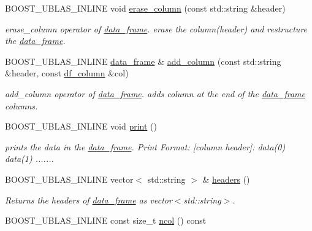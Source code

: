 \begin{DoxyCompactItemize}
B\+O\+O\+S\+T\+\_\+\+U\+B\+L\+A\+S\+\_\+\+I\+N\+L\+I\+NE void \hyperlink{classboost_1_1numeric_1_1ublas_1_1data__frame_a644ace7139044eaabf7e0a0e45f63b2e}{erase\+\_\+column} (const std\+::string \&header)
\begin{DoxyCompactList}\small\item\em erase\+\_\+column operator of \hyperlink{classboost_1_1numeric_1_1ublas_1_1data__frame}{data\+\_\+frame}. erase the column({\ttfamily header}) and restructure the \hyperlink{classboost_1_1numeric_1_1ublas_1_1data__frame}{data\+\_\+frame}. \end{DoxyCompactList}\item 
B\+O\+O\+S\+T\+\_\+\+U\+B\+L\+A\+S\+\_\+\+I\+N\+L\+I\+NE \hyperlink{classboost_1_1numeric_1_1ublas_1_1data__frame}{data\+\_\+frame} \& \hyperlink{classboost_1_1numeric_1_1ublas_1_1data__frame_a8f67aa27f8f340e8bfd42ce0f7713be0}{add\+\_\+column} (const std\+::string \&header, const \hyperlink{classboost_1_1numeric_1_1ublas_1_1df__column}{df\+\_\+column} \&col)
\begin{DoxyCompactList}\small\item\em add\+\_\+column operator of \hyperlink{classboost_1_1numeric_1_1ublas_1_1data__frame}{data\+\_\+frame}. adds column at the end of the \hyperlink{classboost_1_1numeric_1_1ublas_1_1data__frame}{data\+\_\+frame} columns. \end{DoxyCompactList}\item 
B\+O\+O\+S\+T\+\_\+\+U\+B\+L\+A\+S\+\_\+\+I\+N\+L\+I\+NE void \hyperlink{classboost_1_1numeric_1_1ublas_1_1data__frame_a2aae0aa66a1eadc3301b40cd104596c1}{print} ()
\begin{DoxyCompactList}\small\item\em prints the data in the \hyperlink{classboost_1_1numeric_1_1ublas_1_1data__frame}{data\+\_\+frame}. Print Format\+: \mbox{[}column header\mbox{]}\+: data(0) data(1) ....... \end{DoxyCompactList}\item 
B\+O\+O\+S\+T\+\_\+\+U\+B\+L\+A\+S\+\_\+\+I\+N\+L\+I\+NE vector$<$ std\+::string $>$ \& \hyperlink{classboost_1_1numeric_1_1ublas_1_1data__frame_aff5e603e988e7b710a3df6104d706c12}{headers} ()
\begin{DoxyCompactList}\small\item\em Returns the headers of \hyperlink{classboost_1_1numeric_1_1ublas_1_1data__frame}{data\+\_\+frame} as vector$<$std\+::string$>$. \end{DoxyCompactList}\item 
B\+O\+O\+S\+T\+\_\+\+U\+B\+L\+A\+S\+\_\+\+I\+N\+L\+I\+NE const size\+\_\+t \hyperlink{classboost_1_1numeric_1_1ublas_1_1data__frame_adf7817e6cf0dcc7fa6d892a351b5c9a8}{ncol} () const 

\end{DoxyCompactItemize}
